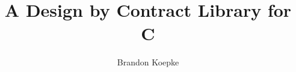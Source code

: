 \usepackage[margin=1in]{geometry}
\usepackage{noweb}
\noweboptions{}
\title{A Design by Contract Library for C}
\author{Brandon Koepke}

